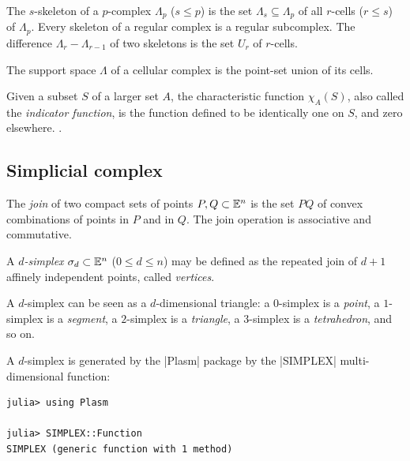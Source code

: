 \begin{definition}[Skeleton]
The $s$-skeleton of a $p$-complex $\Lambda_p$ ($s\leq p$) is the set $\Lambda_s\subseteq\Lambda_p$ of all $r$-cells ($r\leq s$) of $\Lambda_p$. Every skeleton of a regular complex is a regular subcomplex.
The difference $\Lambda_r - \Lambda_{r-1}$ of two skeletons is the set $U_r$ of $r$-cells. 
\end{definition}

\begin{definition}
The support space $\Lambda$ of a cellular complex is the point-set union of its cells. 
\end{definition}

\begin{definition}
Given a subset $S$ of a larger set $A$, the characteristic function $\chi_A(S)$, also called the \emph{indicator function}, is the function defined to be identically one on $S$, and zero elsewhere. \cite{Wolfram}.
\end{definition}


\subsection{Simplicial complex}\label{sect:3-2-1}


\begin{definition}
The {\em join} of two compact sets of points $P,Q\subset\mathbb{E}^n$ is the set $PQ$ of convex combinations of points in $P$  and in $Q$.
The join operation is associative and commutative.  
\end{definition}


\begin{definition}[Simplex.]
A {\em $d$-simplex} $\sigma_{d}\subset \mathbb{E}^n$ ($0\leq d\leq n$) may be
defined as the repeated join of $d+1$ affinely independent points,
called {\em vertices}.  
\end{definition}
A $d$-simplex can be seen as a $d$-dimensional
triangle: a $0$-simplex is a \emph{point}, a $1$-simplex is a
\emph{segment}, a $2$-simplex is a \emph{triangle}, a $3$-simplex is a
\emph{tetrahedron}, and so on.


\begin{coding}  A $d$-simplex is generated by the |Plasm| package by the |SIMPLEX| multi-dimensional function:
\begin{lstlisting}[language=JuliaLocal, style=julia, mathescape = true] 
julia> using Plasm

julia> SIMPLEX::Function
SIMPLEX (generic function with 1 method)
\end{lstlisting}
\end{coding}


